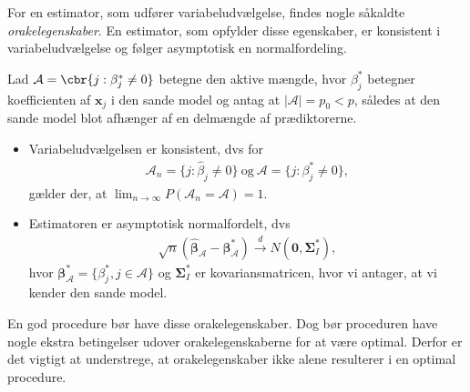 For en estimator, som udfører variabeludvælgelse, findes nogle såkaldte \textit{orakelegenskaber}.
En estimator, som opfylder disse egenskaber, er konsistent i variabeludvælgelse og følger asymptotisk en normalfordeling.

Lad $\mathcal{A} =\cbr{j:\beta_j^* \neq 0}$ betegne den aktive mængde, hvor $\beta_j^*$ betegner koefficienten af $\mathbf{x}_j$ i den sande model og antag at $\vert \mathcal{A} \vert=p_0 <p$, således at den sande model blot afhænger af en delmængde af prædiktorerne. 
\begin{defn}[Orakelegenskaber]
\begin{itemize}
\item Variabeludvælgelsen er konsistent, dvs for
\begin{align*}
\mathcal{A}_n=\lbrace j :\widehat{\beta}_j \neq 0 \rbrace \ \text{og} \ \mathcal{A} =\{j:\beta_j^* \neq 0\},
\end{align*}
gælder der, at $\lim_{n \rightarrow \infty }P(\mathcal{A}_n=\mathcal{A})=1$.
\item Estimatoren er asymptotisk normalfordelt, dvs
\begin{align*}
\sqrt{n}(\widehat{\boldsymbol{\beta}}_\mathcal{A}-\boldsymbol{\beta}^*_\mathcal{A}) \overset{d}{\rightarrow} N(\mathbf{0}, \boldsymbol{\Sigma}^*_I),
\end{align*}
hvor $\boldsymbol{\beta}^*_\mathcal{A}=\{ \beta_j^*, j \in \mathcal{A} \}$ og $\boldsymbol{\Sigma}^*_I$ er kovariansmatricen, hvor vi antager, at vi kender den sande model.
\end{itemize}
\end{defn}
En god procedure bør have disse orakelegenskaber.
Dog bør proceduren have nogle ekstra betingelser udover orakelegenskaberne for at være optimal.
Derfor er det vigtigt at understrege, at orakelegenskaber ikke alene resulterer i en optimal procedure.